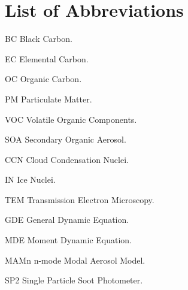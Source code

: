 \documentclass[12pt, fullpage]{uiucthesis2009}
\begin{document}
\tableofcontents
\listoffigures

\chapter{List of Abbreviations}

\begin{symbollist*}
\item[BC] Black Carbon.
\item[EC] Elemental Carbon.
\item[OC] Organic Carbon.
\item[PM] Particulate Matter.
\item[VOC] Volatile Organic Components.
\item[SOA] Secondary Organic Aerosol.
\item[CCN] Cloud Condensation Nuclei.
\item[IN] Ice Nuclei.
\item[TEM] Transmission Electron Microscopy.
\item[GDE] General Dynamic Equation.
\item[MDE] Moment Dynamic Equation.
\item[MAMn] n-mode Modal Aerosol Model.
\item[SP2] Single Particle Soot Photometer.

\end{symbollist*}



\mainmatter
\end{document}
